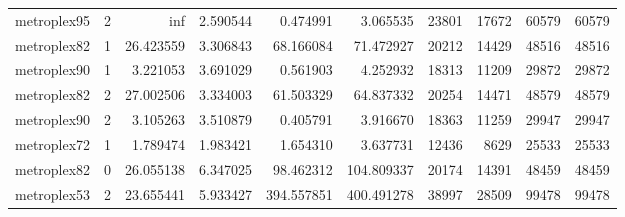 \begin{longtable}{|l|r|r|r|r|r|r|r|r|r|}
metroplex95 & 2 & inf & 2.590544 & 0.474991 & 3.065535 & 23801 & 17672 & 60579 & 60579 \\
metroplex82 & 1 & 26.423559 & 3.306843 & 68.166084 & 71.472927 & 20212 & 14429 & 48516 & 48516 \\
metroplex90 & 1 & 3.221053 & 3.691029 & 0.561903 & 4.252932 & 18313 & 11209 & 29872 & 29872 \\
metroplex82 & 2 & 27.002506 & 3.334003 & 61.503329 & 64.837332 & 20254 & 14471 & 48579 & 48579 \\
metroplex90 & 2 & 3.105263 & 3.510879 & 0.405791 & 3.916670 & 18363 & 11259 & 29947 & 29947 \\
metroplex72 & 1 & 1.789474 & 1.983421 & 1.654310 & 3.637731 & 12436 & 8629 & 25533 & 25533 \\
metroplex82 & 0 & 26.055138 & 6.347025 & 98.462312 & 104.809337 & 20174 & 14391 & 48459 & 48459 \\
metroplex53 & 2 & 23.655441 & 5.933427 & 394.557851 & 400.491278 & 38997 & 28509 & 99478 & 99478 \\
\end{longtable}

